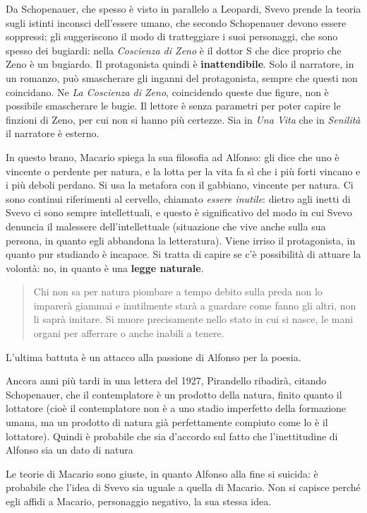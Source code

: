 \documentclass[a4paper, twoside, titlepage]{book}
\newcommand{\citazione}[1]{%
  \begin{quotation}
  \noindent #1
  \end{quotation}}
\begin{document}
Da Schopenauer, che spesso è visto in parallelo a Leopardi, Svevo prende la teoria sugli istinti inconsci dell'essere umano, che secondo Schopenauer devono essere soppressi; gli suggeriscono il modo di tratteggiare i suoi personaggi, che sono spesso dei bugiardi: nella \textit{Coscienza di Zeno} è il dottor S che dice proprio che Zeno è un bugiardo. Il protagonista quindi è \textbf{inattendibile}. Solo il narratore, in un romanzo, può smascherare gli inganni del protagonista, sempre che questi non coincidano. Ne \textit{La Coscienza di Zeno}, coincidendo queste due figure, non è possibile smascherare le bugie. Il lettore è senza parametri per poter capire le finzioni di Zeno, per cui non si hanno più certezze. Sia in \textit{Una Vita} che in \textit{Senilità} il narratore è esterno.

In questo brano, Macario spiega la sua filosofia ad Alfonso: gli dice che uno è vincente o perdente per natura, e la lotta per la vita fa sì che i più forti vincano e i più deboli perdano. Si usa la metafora con il gabbiano, vincente per natura. Ci sono continui riferimenti al cervello, chiamato \textit{essere inutile}: dietro agli inetti di Svevo ci sono sempre intellettuali, e questo è significativo del modo in cui Svevo denuncia il malessere dell'intellettuale (situazione che vive anche sulla sua persona, in quanto egli abbandona la letteratura). Viene irriso il protagonista, in quanto pur studiando è incapace.
Si tratta di capire se c'è possibilità di attuare la volontà: no, in quanto è una \textbf{legge naturale}.
\citazione{Chi non sa per natura piombare a tempo debito sulla preda non lo imparerà giammai e inutilmente starà a guardare come fanno gli altri, non li saprà imitare. Si muore precisamente nello stato in cui si nasce, le mani organi per afferrare o anche inabili a tenere.}

L'ultima battuta è un attacco alla passione di Alfonso per la poesia.

Ancora anni più tardi in una lettera del 1927, Pirandello ribadirà, citando Schopenauer, che il contemplatore è un prodotto della natura, finito quanto il lottatore (cioè il contemplatore non è a uno stadio imperfetto della formazione umana, ma un prodotto di natura già perfettamente compiuto come lo è il lottatore). Quindi è probabile che sia d'accordo sul fatto che l'inettitudine di Alfonso sia un dato di natura

Le teorie di Macario sono giuste, in quanto Alfonso alla fine si suicida: è probabile che l'idea di Svevo sia uguale a quella di Macario.
Non si capisce perché egli affidi a Macario, personaggio negativo, la sua stessa idea.
\end{document}
